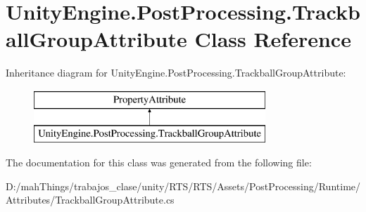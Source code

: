 \hypertarget{class_unity_engine_1_1_post_processing_1_1_trackball_group_attribute}{}\section{Unity\+Engine.\+Post\+Processing.\+Trackball\+Group\+Attribute Class Reference}
\label{class_unity_engine_1_1_post_processing_1_1_trackball_group_attribute}
Inheritance diagram for Unity\+Engine.\+Post\+Processing.\+Trackball\+Group\+Attribute\+:\begin{figure}[H]
\begin{center}
\leavevmode
\includegraphics[height=2.000000cm]{class_unity_engine_1_1_post_processing_1_1_trackball_group_attribute}
\end{center}
\end{figure}


The documentation for this class was generated from the following file\+:\begin{DoxyCompactItemize}
\item 
D\+:/mah\+Things/trabajos\+\_\+clase/unity/\+R\+T\+S/\+R\+T\+S/\+Assets/\+Post\+Processing/\+Runtime/\+Attributes/Trackball\+Group\+Attribute.\+cs\end{DoxyCompactItemize}
